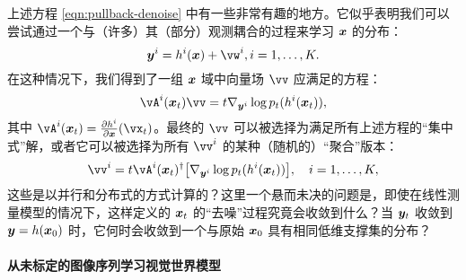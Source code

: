 \documentclass[../../book-main_zh.tex]{subfiles}
\begin{document}
\begin{remark}[并行感知与分布式去噪]
{上述方程 \eqref{eqn:pullback-denoise} 中有一些非常有趣的地方。它似乎表明我们可以尝试通过一个与（许多）其（部分）观测耦合的过程来学习 $\bm{x}$ 的分布：
\begin{equation}
\y^i = h^i(\x) +\vw^i, i =1, \ldots, K.
\end{equation} 在这种情况下，我们得到了一组 $\bm{x}$ 域中向量场 $\vv$ 应满足的方程：
\begin{equation}
    \vA^i(\x_t) \vv = t \nabla_{\y^i} \log p_t(h^i(\x_t)),
\label{eqn:federated-pushforward}
\end{equation}
其中 $\vA^i(\x_t) = \frac{\partial h^i}{\partial \x}(\vx_t)$。最终的 $\vv$ 可以被选择为满足所有上述方程的“集中式”解，或者它可以被选择为所有 $\vv^i$ 的某种（随机的）“聚合”版本：
\begin{equation}
    \vv^i = t\vA^i(\x_t)^\dagger \big[\nabla_{\y^i} \log p_t(h^i(\x_t))\big], \quad i = 1, \ldots, K,
\end{equation}
这些是以并行和分布式的方式计算的？这里一个悬而未决的问题是，即使在线性测量模型的情况下，这样定义的 $\bm{x}_t$ 的“去噪”过程究竟会收敛到什么？当 $\bm{y}_t$ 收敛到 $\bm{y} = h(\bm{x}_0)$ 时，它何时会收敛到一个与原始 $\bm{x}_0$ 具有相同低维支撑集的分布？ }
\end{remark}



\paragraph{从未标定的图像序列学习视觉世界模型}
\end{document}
